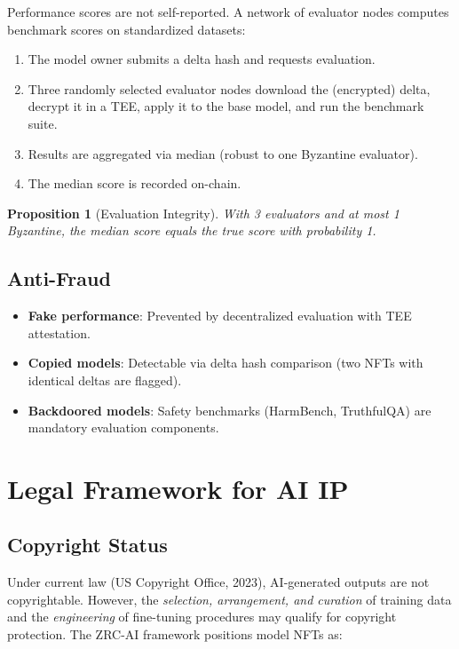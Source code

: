 \documentclass[11pt,letterpaper]{article}
\newtheorem{proposition}[theorem]{Proposition}
\begin{document}
Performance scores are not self-reported. A network of evaluator nodes computes benchmark scores on standardized datasets:

\begin{enumerate}
    \item The model owner submits a delta hash and requests evaluation.
    \item Three randomly selected evaluator nodes download the (encrypted) delta, decrypt it in a TEE, apply it to the base model, and run the benchmark suite.
    \item Results are aggregated via median (robust to one Byzantine evaluator).
    \item The median score is recorded on-chain.
\end{enumerate}

\begin{proposition}[Evaluation Integrity]
With 3 evaluators and at most 1 Byzantine, the median score equals the true score with probability 1.
\end{proposition}

\subsection{Anti-Fraud}

\begin{itemize}
    \item \textbf{Fake performance}: Prevented by decentralized evaluation with TEE attestation.
    \item \textbf{Copied models}: Detectable via delta hash comparison (two NFTs with identical deltas are flagged).
    \item \textbf{Backdoored models}: Safety benchmarks (HarmBench, TruthfulQA) are mandatory evaluation components.
\end{itemize}

\section{Legal Framework for AI IP}

\subsection{Copyright Status}

Under current law (US Copyright Office, 2023), AI-generated outputs are not copyrightable. However, the \emph{selection, arrangement, and curation} of training data and the \emph{engineering} of fine-tuning procedures may qualify for copyright protection. The ZRC-AI framework positions model NFTs as:
\end{document}
